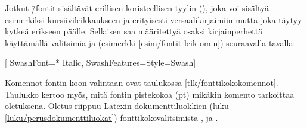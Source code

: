 Jotkut  \=/fontit sisältävät erillisen
koristeellisen tyylin (), joka voi sisältyä esimerkiksi
kursiivileikkaukseen ja erityisesti versaalikirjaimiin mutta joka täytyy
kytkeä erikseen päälle. Sellaisen saa määritettyä osaksi kirjainperhettä
käyttämällä valitsimia  ja 
(esimerkki \ref{esim/fontit-leik-omin}) seuraavalla tavalla:

\begin{koodilohkosis}
\setmainfont{Garamond Libre}[
  SwashFont={* Italic},         %
  SwashFeatures={Style=Swash}]  %
\end{koodilohkosis}

\noindent
Komennot fontin koon valintaan ovat taulukossa
\ref{tlk/fonttikokokomennot}. Taulukko kertoo myös, mitä fontin
pistekokoa (pt) mikäkin komento tarkoittaa oletuksena. Oletus riippuu
Latexin dokumenttiluokkien (luku \ref{luku/perusdokumenttiluokat})
fonttikokovalitsimista \koodi{10pt}, \koodi{11pt} ja \koodi{12pt}.


%

